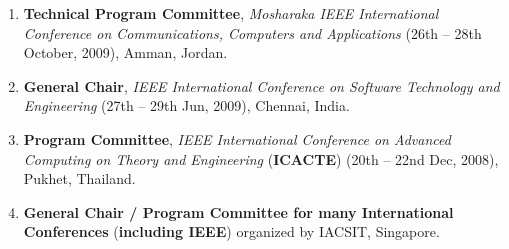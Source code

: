 \begin{enumerate}
\item
\textbf{Technical Program Committee}, \textit{Mosharaka IEEE International Conference on Communications, Computers and Applications} (26th – 28th October, 2009), Amman, Jordan.

\item
\textbf{General Chair}, \textit{IEEE International Conference on Software Technology and Engineering} (27th – 29th Jun, 2009), Chennai, India.

\item 
\textbf{Program Committee},\textit{ IEEE International Conference on Advanced Computing on Theory and Engineering} (\textbf{ICACTE}) (20th – 22nd Dec, 2008), Pukhet, Thailand. 

\item
\textbf{General Chair / Program Committee for many International Conferences} (\textbf{including IEEE}) organized by IACSIT, Singapore.

\end{enumerate}